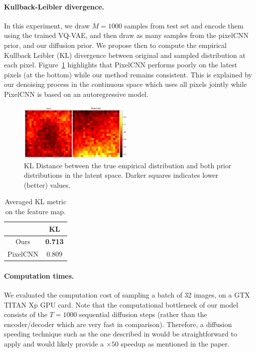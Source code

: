 \documentclass{article}
\theoremstyle{plain}
\theoremstyle{definition}
\theoremstyle{remark}
\begin{document}
\paragraph{Kullback-Leibler divergence. }
In this experiment,  we draw $M=1000$ samples from test set and encode them using the trained VQ-VAE, and then draw as many samples from the pixelCNN prior, and our diffusion prior. We propose then to compute the empirical Kullback Leibler (KL) divergence between original and sampled distribution at each pixel. Figure~\ref{fig:klmap} highlights that PixelCNN performs poorly on the latest pixels (at the bottom) while our method remains consistent. This is explained by our denoising process in the continuous space which uses all pixels jointly while  PixelCNN is based on an autoregressive model. 
\begin{figure}[htpb]
    \centering
    \includegraphics[width=0.49\textwidth]{images/klmap_comparison.png}
    \caption{KL Distance between the true empirical distribution and both prior distributions in the latent space. Darker squares indicates lower (better) values.}
    \label{fig:klmap}
    \vspace{-2mm}
\end{figure}

\begin{table}[htpb]
    \centering
    \begin{tabular}{c c}
        \toprule
         & KL \\
        \toprule
        Ours & {\bf 0.713}\\
        PixelCNN & 0.809 \\
        \bottomrule
    \end{tabular}
    \caption{Averaged KL metric on the feature map.}
    \label{tab:metrics}
    \vspace{-4mm}
\end{table}

\paragraph{Computation times. }
We evaluated the computation cost of sampling a batch of 32 images, on a GTX TITAN Xp GPU card. Note that the computational bottleneck of our model consists of the $T=1000$ sequential diffusion steps (rather than the encoder/decoder which are very fast in comparison). Therefore, a diffusion speeding technique such as the one described in \cite{song2021denoising} would be straightforward to apply and would likely provide a $\times 50$ speedup as mentioned in the paper.
\end{document}

